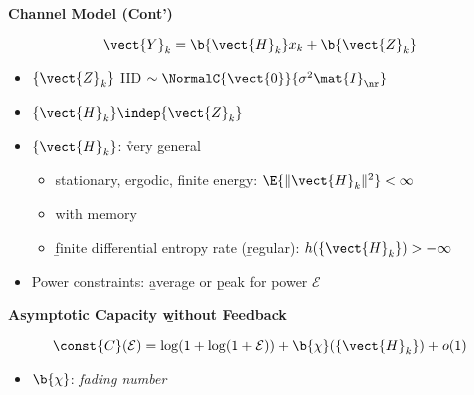 \documentclass[landscape,dvips,a4]{seminar}
\begin{document}
\begin{slide}
  \begin{center}
    \textbf{\Large Channel Model (Cont')}
  \end{center}
 \vspace{3mm}
 \begin{equation*}
   \vect{Y}_k={\b{\vect{H}_k}}x_k+{\b{\vect{Z}_k}}
 \end{equation*}
   \begin{itemize}
   \item $\{\vect{Z}_k\}$ IID $\sim \NormalC{\vect{0}}{\sigma^2
    \mat{I}_{\nr}}$
      \item $\{\vect{H}_k\} \indep \{\vect{Z}_k\}$
    \item $\{\vect{H}_k\}$: {\r{very general}}
      \begin{itemize}
      \item stationary, ergodic, finite energy: $\E{\|\vect{H}_k\|^2} < \infty$
          \item with memory          
\item {\b finite} differential entropy rate ({\b regular}): $h(\{\vect{H}_k\}) > -\infty$
        \end{itemize} 
        \item Power constraints: {\b average} or {\b peak} for power $\mathcal{E}$
\end{itemize}
\end{slide}

\begin{slide}
  \begin{center}
    \textbf{\Large Asymptotic Capacity {\b{without}} Feedback}
  \end{center}
 \vspace{3mm}
\begin{equation*}
  \const{C}(\mathcal{E}) = \log(1+\log(1+\mathcal{E})) + {\b{\chi}}(\{\vect{H}_k\}) + o(1)
\end{equation*}
\begin{itemize}
\item ${\b{\chi}}$: \emph{fading number} %
\end{itemize}
\end{slide}
\end{document}
